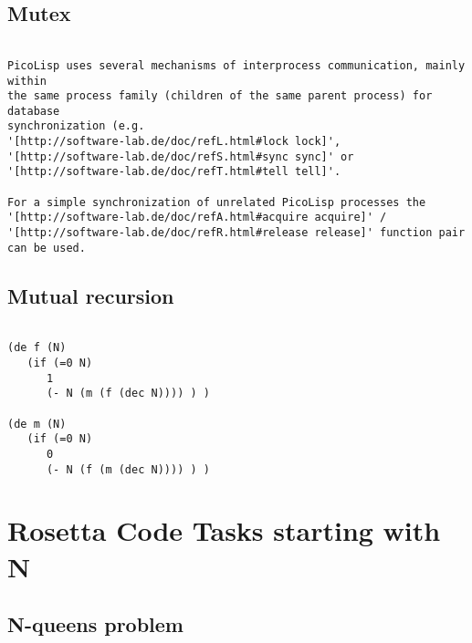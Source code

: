 \section*{Mutex}

\begin{verbatim}

PicoLisp uses several mechanisms of interprocess communication, mainly within
the same process family (children of the same parent process) for database
synchronization (e.g.
'[http://software-lab.de/doc/refL.html#lock lock]',
'[http://software-lab.de/doc/refS.html#sync sync]' or
'[http://software-lab.de/doc/refT.html#tell tell]'.

For a simple synchronization of unrelated PicoLisp processes the
'[http://software-lab.de/doc/refA.html#acquire acquire]' /
'[http://software-lab.de/doc/refR.html#release release]' function pair
can be used.

\end{verbatim}

\section*{Mutual recursion}

\begin{verbatim}

(de f (N)
   (if (=0 N)
      1
      (- N (m (f (dec N)))) ) )

(de m (N)
   (if (=0 N)
      0
      (- N (f (m (dec N)))) ) )

\end{verbatim}

\chapter{Rosetta Code Tasks starting with N}

\section*{N-queens problem}

